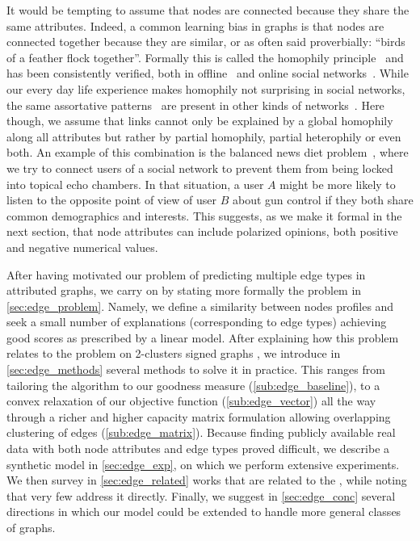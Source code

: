 It would be tempting to assume that nodes are connected because they share the same attributes.
Indeed, a common learning bias in graphs is
that nodes are connected together because they are similar, or as often said proverbially:
\enquote{birds of a feather flock together}. Formally this is called the homophily
principle~\autocite{Homophily01} and has been consistently verified, both in
offline~\autocites{homoAttitude78}{homoEdu85} and online social
networks~\autocites{homoSN09}{homoSN12}. While our every day life experience makes homophily not
surprising in social networks, the same assortative patterns~\autocite{AssortativeMixing02} are
present in other kinds of networks~\autocite{AssortativeMixing09}. Here though, we assume that links
cannot only be explained by a global homophily along all attributes but rather by partial homophily,
partial heterophily or even both. An example of this combination is the balanced news
diet problem~\autocite{balancedNews17}, where we try to connect users of a social network to prevent them
from being locked into topical echo chambers. In that situation, a user $A$ might be more likely to listen to
the opposite point of view of user $B$ about gun control if they both share common demographics and
interests. This suggests, as we make it formal in the next section, that node attributes can include
polarized opinions, \ie{} both positive and negative numerical values.

\medskip

After having motivated our problem of predicting multiple edge types in attributed graphs, we carry
on by stating more formally the \ecp{} problem in \autoref{sec:edge_problem}. Namely, we define a
similarity between nodes profiles and seek a small number of explanations (corresponding to edge
types) achieving good scores as prescribed by a linear model. After explaining how this problem relates
to the \esp{} problem on 2-clusters signed graphs
, we introduce in \autoref{sec:edge_methods} several
methods to solve it in practice. This ranges from tailoring the \kmeans{} algorithm to our goodness
measure (\autoref{sub:edge_baseline}), to a convex relaxation of our objective function
(\autoref{sub:edge_vector}) all the way through a richer and higher capacity matrix formulation allowing
overlapping clustering of edges (\autoref{sub:edge_matrix}). Because finding publicly available real
data with both node attributes and edge types proved difficult, we describe a synthetic model in
\autoref{sec:edge_exp}, on which we perform extensive experiments. We then survey in
\autoref{sec:edge_related} works that are related to the \ecp{}, while noting that very few address
it directly. Finally, we suggest in \autoref{sec:edge_conc} several directions in which our model
could be extended to handle more general classes of graphs.
